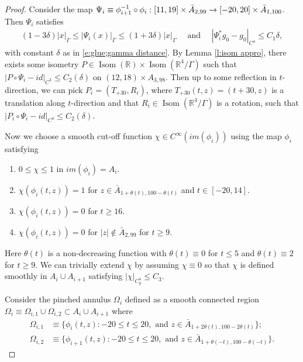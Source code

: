 \documentclass[11pt,reqno]{amsart}
\numberwithin{equation}{section}
\newcommand{\RR}{\mathds{R}}
\theoremstyle{definition}
\theoremstyle{remark}
\begin{document}
\begin{proof}
 
 Consider the map $\Psi_i\equiv \phi_{i+1}^{-1} \circ \phi_i : [11,19] \times \Bar{A}_{2,99} \to [-20,20] \times \Bar{A}_{1,100}$. Then $\Psi_i$ satisfies 
 \begin{align*}
     (1-3\delta)|x|_{\Gamma} \leqslant |\Psi_i(x)|_{\Gamma}  \leqslant (1+3\delta) |x|_{\Gamma} \quad \text{ and } \quad |\Psi_i^* g_0 - g_0|_{C^4} \leqslant C_1 \delta,
 \end{align*}
 with constant $\delta$ as in \eqref{e:glue;gamma distance}.
By Lemma \ref{l:isom appro}, there exists some isometry $P\in  \operatorname{Isom}(\RR) \times \operatorname{Isom}(\RR^4/\Gamma)$ such that $|P \circ \Psi_i - id|_{C^3} \leqslant C_2(\delta)$ on $(12, 18) \times A_{3,98}$. Then up to some reflection in $t$-direction, we can pick $P_i = (T_{+30}, R_i)$, where $T_{+30}(t,z) = (t+30, z)$ is a translation along $t$-direction and that $R_i \in \operatorname{Isom}(\RR^4/\Gamma)$ is a rotation,  such that $|P_i \circ \Psi_i -id|_{C^3} \leqslant C_2(\delta)$.

Now we choose a smooth cut-off function $\chi \in C^{\infty}(im(\phi_i))$ using the map $\phi_i$ satisfying 
\begin{enumerate}
    \item $0\leqslant \chi \leqslant 1$ in $im(\phi_i)= A_i$.
    \item $\chi(\phi_i(t,z)) = 1$ for $z \in \bar{A}_{1+\theta(t), 100 - \theta(t)}$ and $t \in [-20, 14]$.
    \item $\chi(\phi_i(t,z)) = 0$ for $t \geqslant 16$.
    \item $\chi(\phi_i(t,z)) = 0$ for $|z| \notin \bar{A}_{2, 99}$ for $t \geqslant 9$.
\end{enumerate}
Here $\theta(t)$ is a non-decreasing function with $\theta(t) \equiv 0$ for $t \leqslant 5$ and $\theta(t) \equiv 2$ for $t \geqslant 9$. We can trivially extend $\chi$ by assuming $\chi \equiv 0$ so that $\chi$ is defined smoothly in $A_i \cup A_{i+1}$ satisfying $|\chi|_{C_g^4} \leqslant C_3$.






Consider the pinched annulus $\Omega_i$ defined as a smooth connected region $\Omega_i \equiv \Omega_{i,1} \cup \Omega_{i,2} \subset A_i \cup A_{i+1}$ where 
\begin{align*}
    \Omega_{i,1} &\equiv \{ \phi_i(t,z) : -20 \leqslant t \leqslant 20, \text{ and }  z \in \bar{A}_{1+2\theta(t), 100 -2\theta(t)} \};\\
    \Omega_{i,2} &\equiv \{ \phi_{i+1}(t,z) : -20 \leqslant t \leqslant 20, \text{ and }  z \in \bar{A}_{1+\theta(-t), 100 -\theta(-t)} \}.
\end{align*}



\end{proof}
\end{document}
